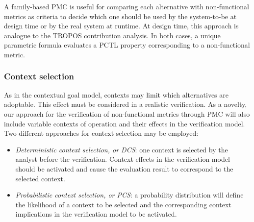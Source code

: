 

A family-based PMC is useful for comparing each alternative with non-functional metrics as criteria to decide which one should be used by the system-to-be at design time or by the real system at runtime. At design time, this approach is analogue to the TROPOS contribution analysis. In both cases, a unique parametric formula evaluates a PCTL property corresponding to a non-functional metric.  %




\subsubsection{Context selection}

As in the contextual goal model, contexts may limit which alternatives are adoptable. This effect must be considered in a realistic verification. As a novelty, our approach for the verification of non-functional metrics through PMC will also include variable contexts of operation and their effects in the verification model. Two different approaches for context selection may be employed: 

\begin{itemize}

\item \textit{Deterministic context selection, or DCS}: one context is selected by the analyst before the verification. Context effects in the verification model should be activated and cause the evaluation result to correspond to the selected context.
\medskip

\item \textit{Probabilistic context selection, or PCS}: a probability distribution will define the likelihood of a context to be selected and the corresponding context implications in the verification model to be activated.  

\end{itemize}

